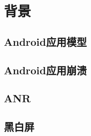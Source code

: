 
\chapter{背景}
\label{chap:background}


\section{Android应用模型}


\section{Android应用崩溃}


\section{ANR}


\section{黑白屏}
